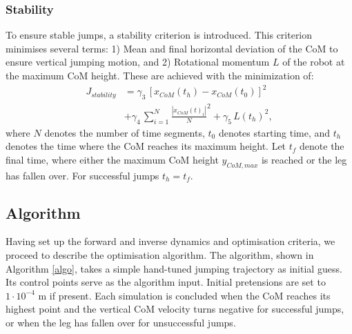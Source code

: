 \documentclass[letterpaper, 10 pt, conference]{ieeeconf}  %
\begin{document}
\subsubsection{Stability}
To ensure stable jumps, a stability criterion is introduced. This criterion minimises several terms: 1) Mean and final horizontal deviation of the CoM to ensure vertical jumping motion, and 2) Rotational momentum $L$ of the robot at the maximum CoM height.
These are achieved with the minimization of:
\begin{equation}
	\begin{aligned}
		J_{stability} & =  \gamma_3 \, \left[ x_{CoM}(t_h) - x_{CoM}(t_0) \right]^2 \\
		& + \gamma_4 \, \sum^{N}_{i=1}\frac{| x_{CoM}(t)_i |}{N}^2   
+ \gamma_5 \, L(t_h)^2,
	\end{aligned}
\end{equation}
where $N$ denotes the number of time segments, $t_0$ denotes starting time, and $t_h$ denotes the time where the CoM reaches its maximum height. Let $t_f$ denote the final time, where either the maximum CoM height $y_{CoM,max}$ is reached or the leg has fallen over. For successful jumps $t_h=t_f$.

\subsection{Algorithm}
\label{subsec:algorithm}
Having set up the forward and inverse dynamics and optimisation criteria, we proceed to describe the optimisation algorithm. The algorithm, shown in Algorithm \ref{algo}, takes a simple hand-tuned jumping trajectory as initial guess. Its control points serve as the algorithm input. Initial pretensions are set to $1 \cdot 10^{-4}$ m if present. Each simulation is concluded when the CoM reaches its highest point and the vertical CoM velocity turns negative for successful jumps, or when the leg has fallen over for unsuccessful jumps. 
\end{document}
